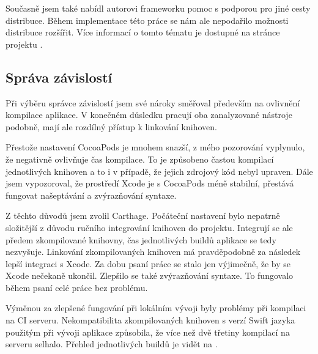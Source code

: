 Současně jsem také nabídl autorovi frameworku pomoc s podporou pro jiné cesty distribuce.
Během implementace této práce se nám ale nepodařilo možnosti distribuce rozšířit.
Více informací o tomto tématu je dostupné na stránce projektu \cite{github-iconic-brew}.

\subsection{Správa závislostí}

Při výběru správce závislostí jsem své nároky směřoval především na ovlivnění kompilace aplikace.
V konečném důsledku pracují oba zanalyzované nástroje podobně, mají ale rozdílný přístup k linkování knihoven.

Přestože nastavení CocoaPods je mnohem snazší, z mého pozorování vyplynulo, že negativně ovlivňuje čas kompilace.
To je způsobeno častou kompilací jednotlivých knihoven a to i v případě, že jejich zdrojový kód nebyl upraven.
Dále jsem vypozoroval, že prostředí Xcode je s CocoaPods méně stabilní, přestává fungovat našeptávání a zvýrazňování syntaxe.

Z těchto důvodů jsem zvolil Carthage.
Počáteční nastavení bylo nepatrně složitější z důvodu ručního integrování knihoven do projektu.
Integrují se ale předem zkompilované knihovny, čas jednotlivých buildů aplikace se tedy nezvyšuje.
Linkování zkompilovaných knihoven má pravděpodobně za následek lepší integraci s Xcode.
Za dobu psaní práce se stalo jen výjimečně, že by se Xcode nečekaně ukončil.
Zlepšilo se také zvýrazňování syntaxe.
To fungovalo během psaní celé práce bez problému.

Výměnou za zlepšené fungování při lokálním vývoji byly problémy při kompilaci na CI serveru.
Nekompatibilita zkompilovaných knihoven s verzí Swift jazyka použitým při vývoji aplikace způsobila, že více než dvě třetiny kompilací na serveru selhalo.
Přehled jednotlivých buildů je vidět na \cite{travis-octophone-builds}.
